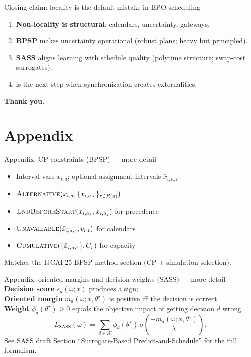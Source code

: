 \documentclass[aspectratio=169,10pt]{beamer}
\newif\iflong
\newcommand{\btext}[1]{\textbf{\color{darkred}#1}}
\newcommand{\smallref}[1]{{\scriptsize\color{darkgray}#1}}
\begin{document}
\begin{frame}{Closing claim: locality is the default mistake in BPO scheduling}
  \begin{enumerate}
    \item \btext{Non-locality is structural}: calendars, uncertainty, gateways.
    \item \btext{BPSP} makes uncertainty operational (robust plans; heavy but principled).
    \item \btext{SASS} aligns learning with schedule quality (polytime structure; swap-cost surrogates).
    \item \iflong\btext{Valuation} internalizes externalities (synchronization + incentives) as the capstone.\else{} is the next step when synchronization creates externalities.\fi
  \end{enumerate}
  \vspace{0.25cm}
  \btext{Thank you.}
\end{frame}

\appendix
\section{Appendix}

\begin{frame}{Appendix: CP constraints (BPSP) — more detail}
  \scriptsize
  \begin{itemize}
    \item Interval vars \(x_{i,a}\); optional assignment intervals \(\bar{x}_{i,a,r}\)
    \item \(\textsc{Alternative}(x_{i,a}, \{\bar{x}_{i,a,r}\}_{r\in R(a)})\)
    \item \(\textsc{EndBeforeStart}(x_{i,a_k},x_{i,a_j})\) for precedence
    \item \(\textsc{Unavailable}(\bar{x}_{i,a,r}, v_{r,t})\) for calendars
    \item \(\textsc{Cumulative}(\{\bar{x}_{i,a,r}\}, C_r)\) for capacity
  \end{itemize}
  \smallref{Matches the IJCAI'25 BPSP method section (CP + simulation selection).}
\end{frame}

\begin{frame}{Appendix: oriented margins and decision weights (SASS) — more detail}
  \scriptsize
  \btext{Decision score} \(s_d(\omega;x)\) produces a sign;\\
  \btext{Oriented margin} \(m_d(\omega;x,\theta^\star)\) is positive iff the decision is correct.\\
  \btext{Weight} \(\phi_d(\theta^\star)\ge 0\) equals the objective impact of getting decision \(d\) wrong.\\
  \[
    L_{\mathrm{SASS}}(\omega)
    =
    \sum_{d\in\mathcal{K}}
      \phi_d(\theta^\star)\,
      \sigma\!\left(\frac{-m_d(\omega;x,\theta^\star)}{\lambda}\right).
  \]
  \smallref{See SASS draft Section ``Surrogate-Based Predict-and-Schedule'' for the full formalism.}
\end{frame}
\end{document}
